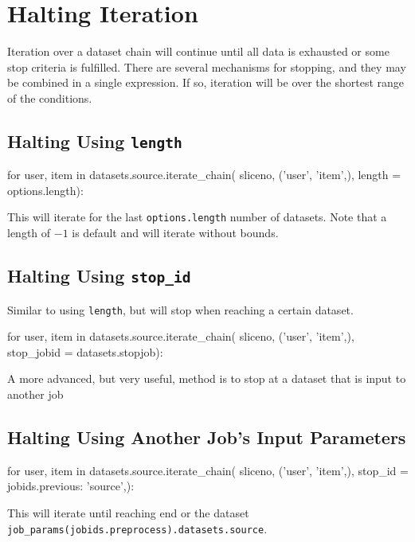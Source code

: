 \section{Halting Iteration}

Iteration over a dataset chain will continue until all data is
exhausted or some stop criteria is fulfilled.  There are several
mechanisms for stopping, and they may be combined in a single
expression.  If so, iteration will be over the shortest range of the
conditions.

\subsection*{Halting Using \texttt{length}}
\begin{python}
for user, item in datasets.source.iterate_chain(
    sliceno, ('user', 'item',),
    length = options.length):
\end{python}
This will iterate for the last \texttt{options.length} number of
datasets.  Note that a length of $-1$ is default and will iterate
without bounds.


\subsection*{Halting Using \texttt{stop\_id}}
Similar to using \texttt{length}, but will stop when reaching a
certain dataset.
\begin{python}
for user, item in datasets.source.iterate_chain(
    sliceno, ('user', 'item',),
    stop_jobid = datasets.stopjob):
\end{python}

A more advanced, but very useful, method is to stop at a dataset that
is input to another job
\subsection*{Halting Using Another Job's Input Parameters}
\begin{python}
for user, item in datasets.source.iterate_chain(
    sliceno, ('user', 'item',),
    stop_id = {jobids.previous: 'source',}):
\end{python}
This will iterate until reaching end or the dataset
\texttt{job\_params(jobids.preprocess).datasets.source}.



